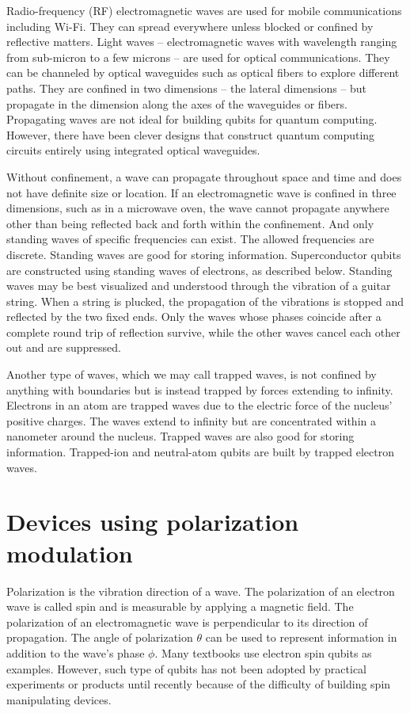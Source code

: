 \documentclass[oneside, letter, 12pt]{book}
\begin{document}
Radio-frequency (RF) electromagnetic waves are used for mobile communications including Wi-Fi. They can spread everywhere unless blocked or confined by reflective matters. Light waves -- electromagnetic waves with wavelength ranging from sub-micron to a few microns -- are used for optical communications. They can be channeled by optical waveguides such as optical fibers to explore different paths. They are confined in two dimensions -- the lateral dimensions -- but propagate in the dimension along the axes of the waveguides or fibers. Propagating waves are not ideal for building qubits for quantum computing. However, there have been clever designs that construct quantum computing circuits entirely using integrated optical waveguides.

Without confinement, a wave can propagate throughout space and time and does not have definite size or location. If an electromagnetic wave is confined in three dimensions, such as in a microwave oven, the wave cannot propagate anywhere other than being reflected back and forth within the confinement. And only standing waves of specific frequencies can exist. The allowed frequencies are discrete. Standing waves are good for storing information. Superconductor qubits are constructed using standing waves of electrons, as described below. Standing waves may be best visualized and understood through the vibration of a guitar string. When a string is plucked, the propagation of the vibrations is stopped and reflected by the two fixed ends. Only the waves whose phases coincide after a complete round trip of reflection survive, while the other waves cancel each other out and are suppressed.

Another type of waves, which we may call trapped waves, is not confined by anything with boundaries but is instead trapped by forces extending to infinity. Electrons in an atom are trapped waves due to the electric force of the nucleus' positive charges. The waves extend to infinity but are concentrated within a nanometer around the nucleus. Trapped waves are also good for storing information. Trapped-ion and neutral-atom qubits are built by trapped electron waves.

\section{Devices using polarization modulation}
Polarization is the vibration direction of a wave. The polarization of an electron wave is called spin and is measurable by applying a magnetic field. The polarization of an electromagnetic wave is perpendicular to its direction of propagation. The angle of polarization $\theta$ can be used to represent information in addition to the wave's phase $\phi$. Many textbooks use electron spin qubits as examples. However, such type of qubits has not been adopted by practical experiments or products until recently\cite{nanotube} because of the difficulty of building spin manipulating devices.
\end{document}
